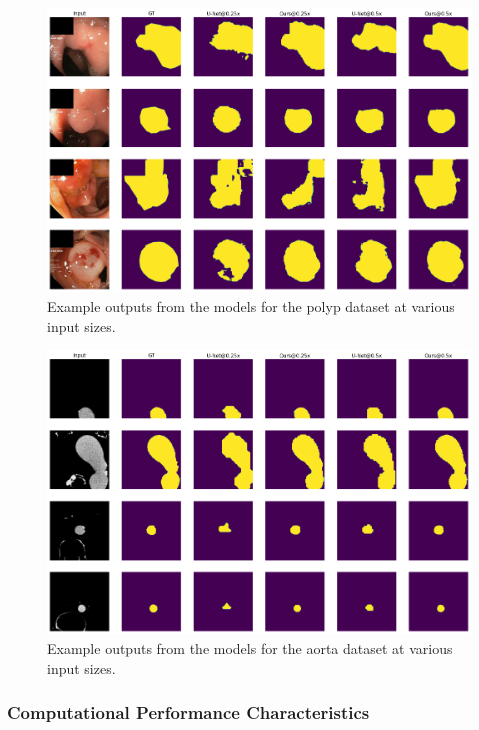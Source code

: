 \begin{figure}[H]
	\includegraphics[width=\textwidth]{images/5/output_examples_polyp.png}
	\caption{Example outputs from the models for the polyp dataset at various input sizes. \cite{bencevicSegmentthenSegmentContextPreservingCropBased2023a}\label{fig:examples-polyp}}
\end{figure}

\begin{figure}[H]
	\includegraphics[width=\textwidth]{images/5/output_examples_aa.png}
	\caption{Example outputs from the models for the aorta dataset at various input sizes. \cite{bencevicSegmentthenSegmentContextPreservingCropBased2023a}\label{fig:examples-aa}}
\end{figure}

\subsubsection{Computational Performance Characteristics}

